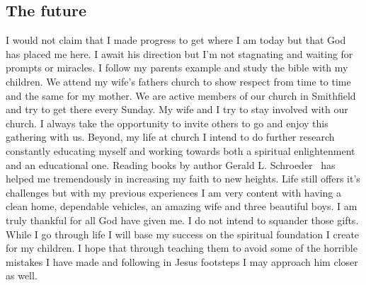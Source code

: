 \documentclass[11pt,a4paper]{scrartcl} %
\begin{document}
\begin{doublespace}
\subsection{The future}
I would not claim that I made progress to get where I am today but that God has placed me here. I await his direction but I'm not stagnating and waiting for prompts or miracles. I follow my parents example and study the bible with my children. We attend my wife's fathers church to show respect from time to time and the same for my mother. We are active members of our church in Smithfield and try to get there every Sunday.  My wife and I try to stay involved with our church. I always take the opportunity to invite others to go and enjoy this gathering with us. Beyond, my life at church I intend to do further research constantly educating myself and working towards both a spiritual enlightenment and an educational one. Reading books by author Gerald L. Schroeder~\cite{gerald-2009} has helped me tremendously in increasing my faith to new heights. Life still offers it's challenges but with my previous experiences I am very content with having a clean home, dependable vehicles, an amazing wife and three beautiful boys. I am truly thankful for all God have given me. I do not intend to squander those gifts. While I go through life I will base my success on the spiritual foundation I create for my children. I hope that through teaching them to avoid some of the horrible mistakes I have made and following in Jesus footsteps I may approach him closer as well.

\end{doublespace}
\clearpage
    \nocite{*}
    
    
\end{document}

